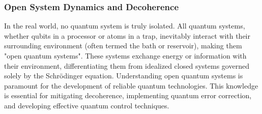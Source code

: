 \documentclass{article}
\begin{document}
\subsubsection{Open System Dynamics and Decoherence}
In the real world, no quantum system is truly isolated. All quantum systems, whether qubits in a processor or atoms in a trap, inevitably interact with their surrounding environment (often termed the bath or reservoir), making them "open quantum systems". These systems exchange energy or information with their environment, differentiating them from idealized closed systems governed solely by the Schrödinger equation. Understanding open quantum systems is paramount for the development of reliable quantum technologies. This knowledge is essential for mitigating decoherence, implementing quantum error correction, and developing effective quantum control techniques.
\end{document}
